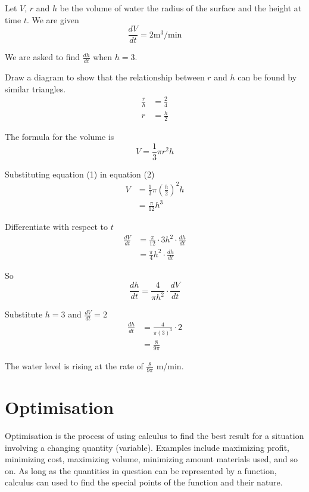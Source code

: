 \begin{multicols}{2}
\solution Let $V$, $r$ and $h$ be the volume of water the radius of the surface and the height at time $t$. We are given
\begin{equation*}\frac{d V}{d t} =2\text{}\mathrm{m}^{3}/\mbox{min}
\end{equation*}

We are asked to find $\frac{d h}{d t}$ when $h =3$.

Draw a diagram to show that the relationship between $r$ and $h$ can be found by similar triangles.
\begin{align}\frac{r}{h} &  = \frac{2}{4} \nonumber  \\
r &  = \frac{h}{2} \tag{1}\end{align}

The formula for the volume is
\begin{equation}V =\frac{1}{3} \pi  r^{2} h\tag{2}
\end{equation}

Substituting equation (1) in equation (2)
\begin{align*}V &  = \frac{1}{3} \pi  \genfrac{(}{)}{}{}{h}{2}^{2} h \\
 &  = \frac{\pi }{12} h^{3}\end{align*}

Differentiate with respect to $t$
\begin{align*}\frac{d V}{d t} &  = \frac{\pi }{12} \cdot 3 h^{2} \cdot \frac{d h}{d t} \\
 &  = \frac{\pi }{4} h^{2} \cdot \frac{d h}{d t}\end{align*}

So
\begin{equation*}\frac{d h}{d t} =\frac{4}{\pi  h^{2}} \cdot \frac{d V}{d t}
\end{equation*}

Substitute $h =3$ and $\frac{d V}{d t} =2$
\begin{align*}\frac{d h}{d t} &  = \frac{4}{\pi  \left (3\right )^{3}} \cdot 2 \\
 &  = \frac{8}{9 \pi }\end{align*}

The water level is rising at the rate of $\frac{8}{9 \pi }$ $\mbox{m}$/$\mbox{min}$.
\end{multicols}


\section{Optimisation}\label{sec:Optimisation}
Optimisation is the process of using calculus to find the best result for a situation involving a changing quantity (variable). Examples include  maximizing profit, minimizing cost, maximizing volume, minimizing amount materials used, and so on. As long as the quantities in question can be represented by a function, calculus can used to find the special points of the function and their nature.

